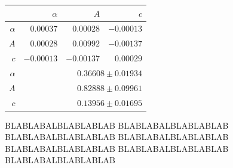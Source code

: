 \begin{figure}
\caption{
BLABLABALBLABLABLAB
BLABLABALBLABLABLAB
BLABLABALBLABLABLAB
BLABLABALBLABLABLAB
BLABLABALBLABLABLAB
BLABLABALBLABLABLAB
BLABLABALBLABLABLAB
}
 \begin{tabular}{|r|r|r|r|}
 \hline 
\cellcolor{tabcolor}&\cellcolor{tabcolor}$\alpha$&\cellcolor{tabcolor}$A$&\cellcolor{tabcolor}$c$\\ \hline 
 \cellcolor{tabcolor}$\alpha$&$0.00037$ &$0.00028$ &$-0.00013$ \\ 
\cellcolor{tabcolor}$A$&$0.00028$ &$0.00992$ &$-0.00137$ \\ 
\cellcolor{tabcolor}$c$&$-0.00013$ &$-0.00137$ &$0.00029$ \\ \hline \hline
\cellcolor{tabcolor}$\alpha$&\multicolumn{3}{r|}{$0.36608 \pm 0.01934$ }\\ 
\cellcolor{tabcolor}$A$&\multicolumn{3}{r|}{$0.82888 \pm 0.09961$ }\\ 
\cellcolor{tabcolor}$c$&\multicolumn{3}{r|}{$0.13956 \pm 0.01695$ }\\ 
\hline
\end{tabular}
\end{figure}

